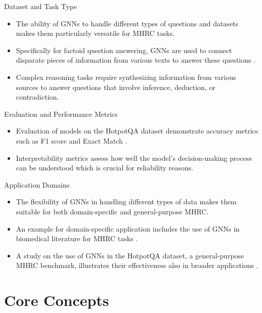 \documentclass[10pt]{beamer}
\begin{document}
\begin{frame}[fragile]{Dataset and Task Type}
  \begin{itemize}
    \item The ability of GNNs to handle different types of questions and datasets makes them particularly versatile for MHRC tasks.
    \item Specifically for factoid question answering, GNNs are used to connect disparate pieces of information from various texts to answer these questions \cite{RN116}.
    \item Complex reasoning tasks require synthesizing information from various sources to answer questions that involve inference, deduction, or contradiction.
  \end{itemize}
\end{frame}

\begin{frame}[fragile]{Evaluation and Performance Metrics}
  \begin{itemize}
    \item Evaluation of models on the HotpotQA dataset demonstrate accuracy metrics such as F1 score and Exact Match \cite{RN116}.
    \item Interpretability metrics assess how well the model's decision-making process can be understood which is crucial for reliability reasons.
  \end{itemize}
\end{frame}

\begin{frame}[fragile]{Application Domains}
  \begin{itemize}
    \item The flexibility of GNNs in handling different types of data makes them suitable for both domain-specific and general-purpose MHRC.
    \item An example for domain-specific application includes the use of GNNs in biomedical literature for MHRC tasks \cite{RN129}.
    \item A study on the use of GNNs in the HotpotQA dataset, a general-purpose MHRC benchmark, illustrates their effectiveness also in broader applications \cite{RN116}.
  \end{itemize}
\end{frame}

\section{Core Concepts}
\end{document}
